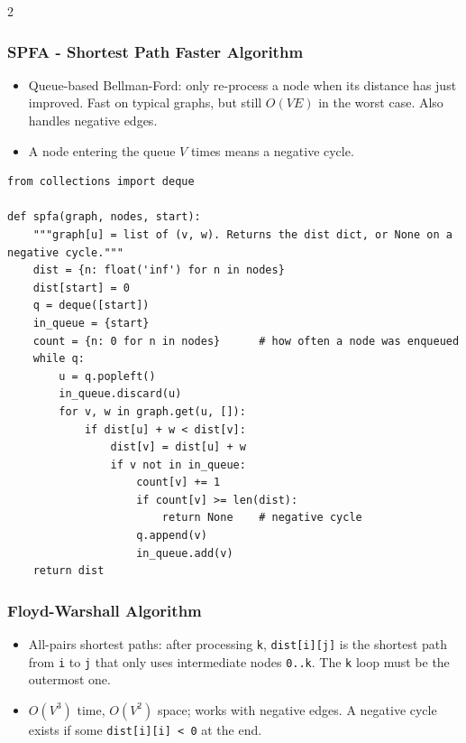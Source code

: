 \documentclass[9pt,a4paper]{extarticle}
\begin{document}
\begin{multicols}{2}
\subsubsection{SPFA - Shortest Path Faster Algorithm}

\begin{itemize}
\item Queue-based Bellman-Ford: only re-process a node when its distance has just improved. Fast on typical graphs, but still $O(VE)$ in the worst case. Also handles negative edges.
\item A node entering the queue $V$ times means a negative cycle.
\end{itemize}

\begin{lstlisting}
from collections import deque

def spfa(graph, nodes, start):
    """graph[u] = list of (v, w). Returns the dist dict, or None on a negative cycle."""
    dist = {n: float('inf') for n in nodes}
    dist[start] = 0
    q = deque([start])
    in_queue = {start}
    count = {n: 0 for n in nodes}      # how often a node was enqueued
    while q:
        u = q.popleft()
        in_queue.discard(u)
        for v, w in graph.get(u, []):
            if dist[u] + w < dist[v]:
                dist[v] = dist[u] + w
                if v not in in_queue:
                    count[v] += 1
                    if count[v] >= len(dist):
                        return None    # negative cycle
                    q.append(v)
                    in_queue.add(v)
    return dist
\end{lstlisting}

\subsubsection{Floyd-Warshall Algorithm}

\begin{itemize}
\item All-pairs shortest paths: after processing \texttt{k}, \texttt{dist[\allowbreak{}i][\allowbreak{}j]} is the shortest path from \texttt{i} to \texttt{j} that only uses intermediate nodes \texttt{0.\allowbreak{}.\allowbreak{}k}. The \texttt{k} loop must be the outermost one.
\item $O(V^3)$ time, $O(V^2)$ space; works with negative edges. A negative cycle exists if some \texttt{dist[\allowbreak{}i][\allowbreak{}i] < 0} at the end.
\end{itemize}


\end{multicols}
\end{document}
